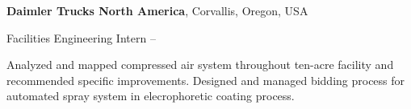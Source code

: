 \documentclass[letterpaper, MMMyyyy, nonstopmode]{simpleresumecv}
\begin{document}
\begin{Body}
\Entry
\textbf{Daimler Trucks North America},
Corvallis, Oregon, USA

\BulletItem
Facilities Engineering Intern
\hfill
{} --

\begin{Detail}
\SubBulletItem
Analyzed and mapped compressed air system throughout ten-acre facility and recommended specific improvements.
\SubBulletItem
Designed and managed bidding process for automated spray system in elecrophoretic coating process.
\end{Detail}


%
%

\end{Body}
\end{document}
